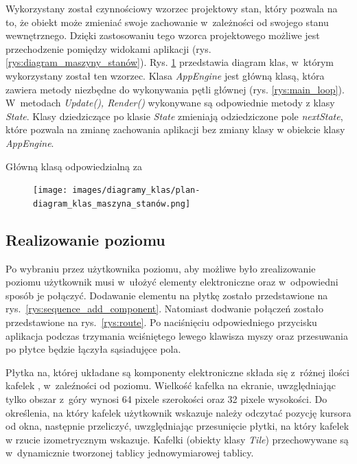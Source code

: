 \documentclass[12pt,a4paper]{article} %
\begin{document}
\aka Wykorzystany został czynnościowy wzorzec projektowy stan, który pozwala na to, że obiekt może zmieniać swoje zachowanie w~zależności od swojego stanu wewnętrznego. Dzięki zastosowaniu tego wzorca projektowego możliwe jest przechodzenie pomiędzy widokami aplikacji (rys. \ref{rys:diagram_maszyny_stanów}). Rys. \ref{rys:diagram_klas_stanów} przedstawia diagram klas, w~którym wykorzystany został ten wzorzec. Klasa \textit{AppEngine} jest główną klasą, która zawiera metody niezbędne do wykonywania pętli głównej (rys. \ref{rys:main_loop}). W~metodach \textit{Update(), Render()} wykonywane są odpowiednie metody z klasy \textit{State}. Klasy dziedziczące po klasie \textit{State} zmieniają odziedziczone pole \textit{nextState}, które pozwala na zmianę zachowania aplikacji bez zmiany klasy w obiekcie klasy \textit{AppEngine}.

\aka Główną klasą odpowiedzialną za 

\begin{figure}[h]
	\centering
	\texttt{[image: images/diagramy\_klas/plan-diagram\_klas\_maszyna\_stanów.png]}
	\caption{}
	\label{rys:diagram_klas_stanów}
\end{figure}



\subsection{Realizowanie poziomu}

\aka Po wybraniu przez użytkownika poziomu, aby możliwe było zrealizowanie poziomu użytkownik musi w~ułożyć elementy elektroniczne oraz w~odpowiedni sposób je połączyć. Dodawanie elementu na płytkę zostało przedstawione na rys.~\ref{rys:sequence_add_component}. 
Natomiast dodwanie połączeń zostało przedstawione na rys.~\ref{rys:route}. Po naciśnięciu odpowiedniego przycisku aplikacja podczas trzymania wciśniętego lewego klawisza myszy oraz przesuwania po płytce będzie łączyła sąsiadujęce pola. 

\aka Płytka na, której układane są komponenty elektroniczne składa się z~różnej ilości kafelek , w~zaleźności od poziomu. Wielkość kafelka na ekranie, uwzględniając tylko obszar z~góry wynosi 64 pixele szerokości oraz 32 pixele wysokości.
Do określenia, na który kafelek użytkownik wskazuje należy odczytać pozycję kursora od okna, następnie przeliczyć, uwzględniając przesunięcie płytki, na który kafelek w rzucie izometrycznym wskazuje. Kafelki (obiekty klasy \textit{Tile}) przechowywane są w~dynamicznie tworzonej tablicy jednowymiarowej tablicy.
\end{document}
